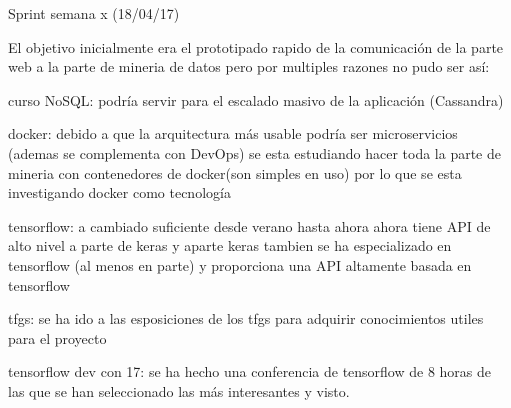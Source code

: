 Sprint semana x (18/04/17)

El objetivo inicialmente era el prototipado rapido de la comunicación de la parte web a la parte de mineria de datos pero por multiples razones no pudo ser así:
\list
\item curso NoSQL: podría servir para el escalado masivo de la aplicación (Cassandra)
\item docker: debido a que la arquitectura más usable podría ser microservicios (ademas se complementa con DevOps) se esta estudiando hacer toda la parte de mineria con contenedores de docker(son simples en uso) por lo que se esta investigando docker como tecnología
\item tensorflow: a cambiado suficiente desde verano hasta ahora ahora tiene API de alto nivel a parte de keras y aparte keras tambien se ha especializado en tensorflow (al menos en parte) y proporciona una API altamente basada en tensorflow
\item tfgs: se ha ido a las esposiciones de los tfgs para adquirir conocimientos utiles para el proyecto
\item tensorflow dev con 17: se ha hecho una conferencia de tensorflow de 8 horas de las que se han seleccionado las más interesantes y visto.
\list

